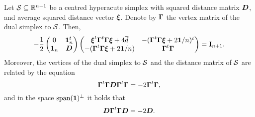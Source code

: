 \begin{lemma}
	Let $\mathcal{S}\subseteq\mathbb{R}^{n-1}$ be a centred hyperacute simplex with  squared distance matrix $\vb*{D}$, and average squared distance vector $\vb*{\xi}$. Denote by $\vb*{\Gamma}$ the vertex matrix of the dual simplex to $\mathcal{S}$. Then, 
	\begin{equation}
	\label{eq:simplex_block_matrix}
	-\frac{1}{2} \begin{pmatrix}
	0 & \vb{1}_n^t \\ 
	\vb{1}_n &  \vb*{D}
	\end{pmatrix}\begin{pmatrix}
	\vb*{\xi}^t \vb*{\Gamma}^t \vb*{\Gamma}\vb*{\xi} + 4\overline{d} & -(\vb*{\Gamma}^t \vb*{\Gamma}\vb*{\xi} + 2\vb{1}/n)^t \\
	-(\vb*{\Gamma}^t \vb*{\Gamma}\vb*{\xi} + 2\vb{1}/n) & \vb*{\Gamma}^t \vb*{\Gamma}
	\end{pmatrix} = \vb{I}_{n+1}.
	\end{equation}
	Moreover, the vertices of the dual simplex to $\mathcal{S}$ and the distance matrix of $\mathcal{S}$ are related by the equation
	\begin{equation}
	\label{eq:lem_inverse_relation}
	\vb*{\Gamma}^t \vb*{\Gamma} \vb*{D} \vb*{\Gamma}^t \vb*{\Gamma} = -2\vb*{\Gamma}^t \vb*{\Gamma},
	\end{equation}
	and in the space $\textnormal{span}(\vb{1})^\perp$ it holds that 
	\begin{equation*}
	\label{eq:lem_inverse_relation2}
	\vb*{D}\vb*{\Gamma}^t \vb*{\Gamma} \vb*{D}= -2\vb*{D}.	
	\end{equation*}
\end{lemma}


